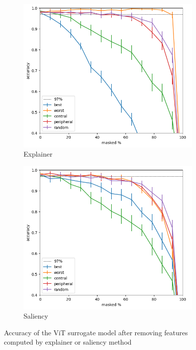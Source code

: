 \documentclass[magisterska,en]{pracamgr}
\begin{document}
\iftrue




\begin{figure}
\centering
\begin{subfigure}{.7\textwidth}
  \centering
  \includegraphics[width=.8\linewidth]{./images/masking_explainer_patches_accuracy_half-0.png}
  \caption{Explainer}
  \label{fig:sub1}
\end{subfigure}%
\begin{subfigure}{.7\textwidth}
  \centering
  \includegraphics[width=.8\linewidth]
{./images/masking_saliency_patches_accuracy_vit_half-0.png}
  \caption{Saliency}
  \label{fig:sub2}
\end{subfigure}
\caption{Accuracy of the ViT surrogate model after removing features computed by explainer or saliency method}
\label{fig:ViT_Saliency_Explainer_CIFAR}
\end{figure}
\end{document}
